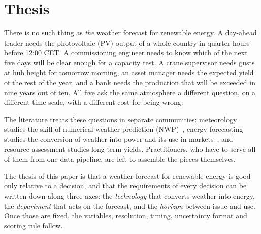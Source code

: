 \section{Thesis}
\label{sec:intro}

There is no such thing as \emph{the} weather forecast for renewable energy. A day-ahead trader needs the photovoltaic (PV) output of a whole country in quarter-hours before 12:00 CET. A commissioning engineer needs to know which of the next five days will be clear enough for a capacity test. A crane supervisor needs gusts at hub height for tomorrow morning, an asset manager needs the expected yield of the rest of the year, and a bank needs the production that will be exceeded in nine years out of ten. All five ask the same atmosphere a different question, on a different time scale, with a different cost for being wrong.

The literature treats these questions in separate communities: meteorology studies the skill of numerical weather prediction (NWP)~\cite{bauer2015quiet}, energy forecasting studies the conversion of weather into power and its use in markets~\cite{hong2020energy,sweeney2020future}, and resource assessment studies long-term yields. Practitioners, who have to serve all of them from one data pipeline, are left to assemble the pieces themselves.

The thesis of this paper is that a weather forecast for renewable energy is good only relative to a decision, and that the requirements of every decision can be written down along three axes: the \emph{technology} that converts weather into energy, the \emph{department} that acts on the forecast, and the \emph{horizon} between issue and use. Once those are fixed, the variables, resolution, timing, uncertainty format and scoring rule follow.

